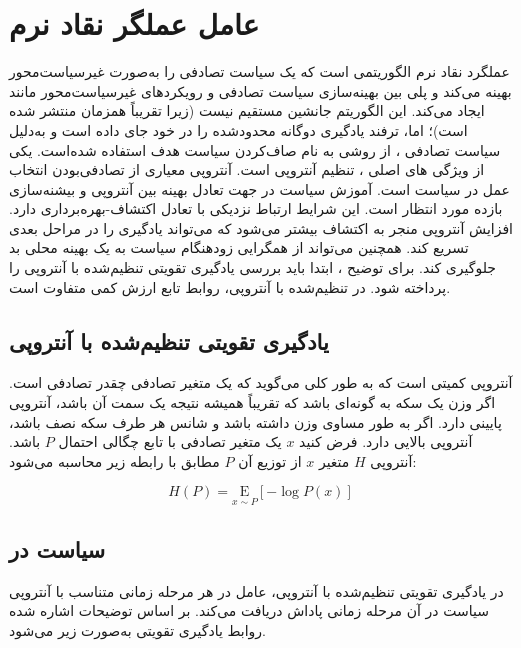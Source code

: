\section{عامل عملگر نقاد نرم}\label{sec:SAC}
عملگرد نقاد نرم
 الگوریتمی است که یک سیاست تصادفی را به‌صورت  غیرسیاست‌محور بهینه می‌کند و پلی بین بهینه‌سازی سیاست تصادفی و رویکردهای غیرسیاست‌محور 
  مانند
  ایجاد می‌کند. این الگوریتم جانشین مستقیم 
  نیست (زیرا تقریباً همزمان منتشر شده است)؛ اما، ترفند یادگیری دوگانه محدود‌شده را در خود جای داده است و به‌دلیل سیاست تصادفی ، از روشی به نام صاف‌کردن سیاست هدف
    استفاده شده‌است.
یکی از ویژگی های اصلی ، تنظیم آنتروپی است.
آنتروپی معیاری از تصادفی‌بودن انتخاب عمل در سیاست است.
 آموزش سیاست در جهت تعادل بهینه بین آنتروپی و بیشنه‌سازی  بازده مورد انتظار است.
  این شرایط ارتباط نزدیکی با تعادل اکتشاف-بهره‌برداری دارد. افزایش آنتروپی منجر به اکتشاف بیشتر می‌شود که می‌تواند یادگیری را در مراحل بعدی تسریع کند. همچنین می‌تواند از همگرایی زودهنگام سیاست به یک بهینه محلی بد جلوگیری کند.
 برای توضیح ، ابتدا باید بررسی یادگیری تقویتی تنظیم‌شده با آنتروپی
  را پرداخته شود. در  تنظیم‌شده با آنتروپی، روابط تابع ارزش کمی متفاوت است.
 
\subsection{یادگیری تقویتی تنظیم‌شده با آنتروپی}
 آنتروپی کمیتی است که به طور کلی می‌گوید که یک متغیر تصادفی چقدر تصادفی است. اگر وزن یک سکه به گونه‌ای باشد که تقریباً همیشه نتیجه یک سمت آن باشد، آنتروپی پایینی دارد. اگر به طور مساوی وزن داشته باشد و شانس هر طرف سکه نصف باشد، آنتروپی بالایی دارد.
 فرض کنید \(x\) یک متغیر تصادفی با تابع چگالی احتمال
\(  P\)
   باشد. آنتروپی
\(    H\)
     متغیر \(x\) از توزیع آن
      \(P\)
       مطابق با رابطه زیر محاسبه می‌شود:
      
      \begin{equation}
      	H(P) =  \underset{x \sim P} {\mathrm E} \left[  {-\log P(x)}  \right]
      \end{equation}
      
      
       \subsection{سیاست در }
       در یادگیری تقویتی تنظیم‌شده با آنتروپی، عامل در هر مرحله زمانی متناسب با آنتروپی سیاست در آن مرحله زمانی پاداش دریافت می‌کند. بر اساس توضیحات اشاره شده روابط یادگیری تقویتی به‌صورت زیر می‌شود.
       
